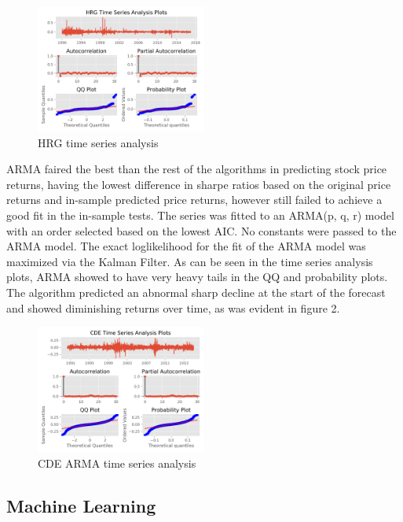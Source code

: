 \documentclass[times]{jtitauth}
\begin{document}
\begin{figure}[!hbp]
\includegraphics[width=0.5\textwidth]{HRG-time-series.png}
\caption{HRG time series analysis}
\end{figure}

ARMA faired the best than the rest of the algorithms in predicting stock price returns, having the lowest difference in sharpe ratios based on the original price returns and in-sample predicted price returns, however still failed to achieve a good fit in the in-sample tests. The series was fitted to an ARMA(p, q, r) model with an order selected based on the lowest AIC. No constants were passed to the ARMA model. The exact loglikelihood for the fit of the ARMA model was maximized via the Kalman Filter. As can be seen in the time series analysis plots, ARMA showed to have very heavy tails in the QQ and probability plots. The algorithm predicted an abnormal sharp decline at the start of the forecast and showed diminishing returns over time, as was evident in figure 2.

\begin{figure}[!hbp]
\includegraphics[width=0.5\textwidth]{CDE-ARMA-time-series.png}
\caption{CDE ARMA time series analysis}
\end{figure}

\subsection{Machine Learning}
\end{document}
